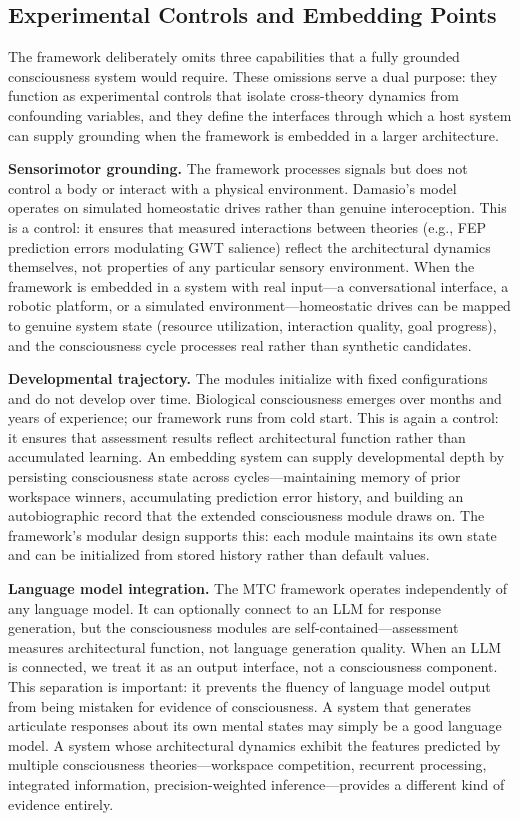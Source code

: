 \subsection{Experimental Controls and Embedding Points}
\label{sec:embedding}

The framework deliberately omits three capabilities that a fully grounded consciousness system would require. These omissions serve a dual purpose: they function as experimental controls that isolate cross-theory dynamics from confounding variables, and they define the interfaces through which a host system can supply grounding when the framework is embedded in a larger architecture.

\textbf{Sensorimotor grounding.} The framework processes signals but does not control a body or interact with a physical environment. Damasio's model operates on simulated homeostatic drives rather than genuine interoception. This is a control: it ensures that measured interactions between theories (e.g., FEP prediction errors modulating GWT salience) reflect the architectural dynamics themselves, not properties of any particular sensory environment. When the framework is embedded in a system with real input---a conversational interface, a robotic platform, or a simulated environment---homeostatic drives can be mapped to genuine system state (resource utilization, interaction quality, goal progress), and the consciousness cycle processes real rather than synthetic candidates.

\textbf{Developmental trajectory.} The modules initialize with fixed configurations and do not develop over time. Biological consciousness emerges over months and years of experience; our framework runs from cold start. This is again a control: it ensures that assessment results reflect architectural function rather than accumulated learning. An embedding system can supply developmental depth by persisting consciousness state across cycles---maintaining memory of prior workspace winners, accumulating prediction error history, and building an autobiographic record that the extended consciousness module draws on. The framework's modular design supports this: each module maintains its own state and can be initialized from stored history rather than default values.

\textbf{Language model integration.} The MTC framework operates independently of any language model. It can optionally connect to an LLM for response generation, but the consciousness modules are self-contained---assessment measures architectural function, not language generation quality. When an LLM is connected, we treat it as an output interface, not a consciousness component. This separation is important: it prevents the fluency of language model output from being mistaken for evidence of consciousness. A system that generates articulate responses about its own mental states may simply be a good language model. A system whose architectural dynamics exhibit the features predicted by multiple consciousness theories---workspace competition, recurrent processing, integrated information, precision-weighted inference---provides a different kind of evidence entirely.

